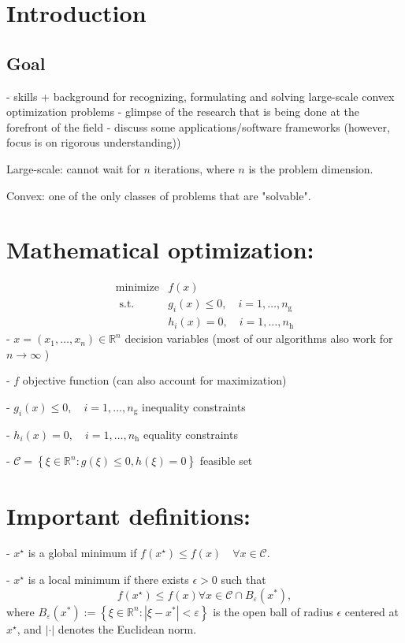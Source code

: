 \section{Introduction}

\subsection{Goal}
- skills + background for recognizing, formulating and solving large-scale convex optimization problems
- glimpse of the research that is being done at the forefront of the field
- discuss some applications/software frameworks (however, focus is on rigorous understanding))

Large-scale: cannot wait for $n$ iterations, where $n$ is the problem dimension.

Convex: one of the only classes of problems that are "solvable".

\section*{Mathematical optimization:}
$$
	\begin{array}{ll}
		\operatorname{minimize} & f(x)                                                        \\
		\text { s.t. }          & g_{i}(x) \leq 0, \quad i=1, \ldots, n_{\mathrm{g}}  \tag{1} \\
		                        & h_{i}(x)=0, \quad i=1, \ldots, n_{\mathrm{h}}
	\end{array}
$$
- $x=\left(x_{1}, \ldots, x_{n}\right) \in \mathbb{R}^{n}$ decision variables (most of our algorithms also work for $n \rightarrow \infty$ )

- $f$ objective function (can also account for maximization)

- $g_{i}(x) \leq 0, \quad i=1, \ldots, n_{\mathrm{g}}$ inequality constraints

- $h_{i}(x)=0, \quad i=1, \ldots, n_{\mathrm{h}}$ equality constraints

- $\mathcal{C}=\left\{\xi \in \mathbb{R}^{n}: g(\xi) \leqslant 0, h(\xi)=0\right\}$ feasible set

\section*{Important definitions:}
- $x^{\star}$ is a global minimum if $f\left(x^{\star}\right) \leq f(x) \quad \forall x \in \mathcal{C}$.

- $x^{\star}$ is a local minimum if there exists $\epsilon>0$ such that
$$
	f\left(x^{\star}\right) \leq f(x) \forall x \in \mathcal{C} \cap B_{\varepsilon}\left(x^{*}\right),
$$
where $B_{\varepsilon}\left(x^{*}\right):=\left\{\xi \in \mathbb{R}^{n}:\left|\xi-x^{*}\right|<\varepsilon\right\}$ is the open ball of radius $\epsilon$ centered at $x^{\star}$, and $|\cdot|$ denotes the Euclidean norm.

